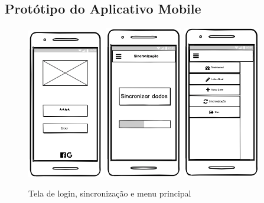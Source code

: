 
\begin{apendicesenv}
\partapendices

\chapter{Protótipo do Aplicativo Mobile} %
\label{chap:apendiceA}

\begin{figure}[h]
    \centering
    \caption{Tela de login, sincronização e menu principal}
    \includegraphics[width=0.3\textwidth]{./dados/figuras/p1.png}
    \includegraphics[width=0.3\textwidth]{./dados/figuras/p2.png}
    \includegraphics[width=0.3\textwidth]{./dados/figuras/p3.png}
    \label{fig:p1}
\end{figure}


\end{apendicesenv}
